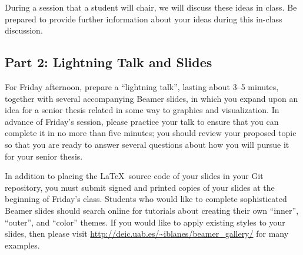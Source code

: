 During a session that a student will chair, we will discuss these ideas in class. Be prepared to provide further
information about your ideas during this in-class discussion.

\subsection*{Part 2: Lightning Talk and Slides}

For Friday afternoon, prepare a ``lightning talk'', lasting about 3--5 minutes, together with several accompanying
Beamer slides, in which you expand upon an idea for a senior thesis related in some way to graphics and visualization.
In advance of Friday's session, please practice your talk to ensure that you can complete it in no more than five
minutes; you should review your proposed topic so that you are ready to answer several questions about how you will
pursue it for your senior thesis.

In addition to placing the \LaTeX\ source code of your slides in your Git repository, you must submit signed and printed
copies of your slides at the beginning of Friday's class. Students who would like to complete sophisticated Beamer
slides should search online for tutorials about creating their own ``inner'', ``outer'', and ``color'' themes. If you
would like to apply existing styles to your slides, then please visit \url{http://deic.uab.es/~iblanes/beamer_gallery/}
for many examples.


